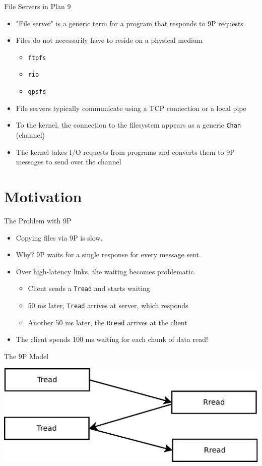 \documentclass[11pt,compress]{beamer}
\begin{document}
\begin{frame}{File Servers in Plan 9}
\begin{itemize}
	\item "File server" is a generic term for a program that responds to 9P requests
	\item Files do not necessarily have to reside on a physical medium
	\begin{itemize}
		\item {\tt ftpfs}
		\item {\tt rio}
		\item {\tt gpsfs}
	\end{itemize}
	\item File servers typically communicate using a TCP connection or a local pipe
	\item To the kernel, the connection to the filesystem appears as a generic {\tt Chan} (channel)
	\item The kernel takes I/O requests from programs and converts them to 9P messages to send over the channel
\end{itemize}
\end{frame}

\section{Motivation}

\begin{frame}{The Problem with 9P}
\begin{itemize}
	\item Copying files via 9P is slow.
	\item Why? 9P waits for a single response for every message sent.
	\item Over high-latency links, the waiting becomes problematic.
	\begin{itemize}
		\item Client sends a {\tt Tread} and starts waiting
		\item 50 ms later, {\tt Tread} arrives at server, which responds
		\item Another 50 ms later, the {\tt Rread} arrives at the client
	\end{itemize}
	\item The client spends 100 ms waiting for each chunk of data read!
\end{itemize}
\end{frame}

\begin{frame}{The 9P Model}
\begin{center}
\includegraphics[width=1.0\textwidth]{9P-read.pdf}
\end{center}
\end{frame}
\end{document}
